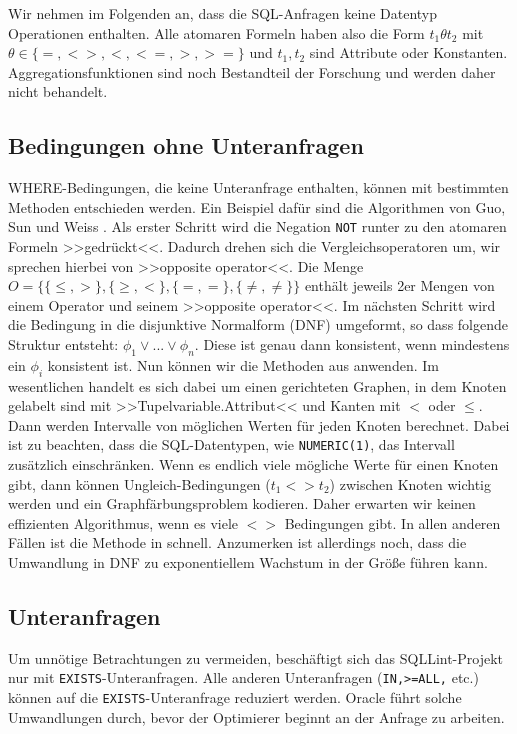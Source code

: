 Wir nehmen im Folgenden an, dass die SQL-Anfragen keine Datentyp Operationen enthalten. Alle atomaren Formeln haben also die Form $t_1\theta t_2$ mit $\theta\in \{=,<>,<,<=,>,>=\}$ und $t_1,t_2$ sind Attribute oder Konstanten. Aggregationsfunktionen sind noch Bestandteil der Forschung und werden daher nicht behandelt.

\subsection{Bedingungen ohne Unteranfragen}

WHERE-Bedingungen, die keine Unteranfrage enthalten, können mit bestimmten Methoden entschieden werden. Ein Beispiel dafür sind die Algorithmen von Guo, Sun und Weiss \cite{decideable1}. Als erster Schritt wird die Negation \verb|NOT| runter zu den atomaren Formeln >>gedrückt<<. Dadurch drehen sich die Vergleichsoperatoren um, wir sprechen hierbei von >>opposite operator<<. Die Menge $O=\{ \{\leq,>\} , \{\geq,<\} , \{ =, =\}, \{\neq,\neq\} \}$ enthält jeweils 2er Mengen von einem Operator und seinem >>opposite operator<<. Im nächsten Schritt wird die Bedingung in die disjunktive Normalform (DNF) umgeformt, so dass folgende Struktur entsteht: $\phi_1 \vee ... \vee \phi_n$. Diese ist genau dann konsistent, wenn mindestens ein $\phi_i$ konsistent ist. Nun können wir die Methoden aus \cite{decideable1} anwenden. Im wesentlichen handelt es sich dabei um einen gerichteten Graphen, in dem Knoten gelabelt sind mit >>Tupelvariable.Attribut<< und Kanten mit $<$ oder $\leq$. Dann werden Intervalle von möglichen Werten für jeden Knoten berechnet. Dabei ist zu beachten, dass die SQL-Datentypen, wie \verb|NUMERIC(1)|, das Intervall zusätzlich einschränken.
Wenn es endlich viele mögliche Werte für einen Knoten gibt, dann können Ungleich-Bedingungen ($t_1<>t_2$) zwischen Knoten wichtig werden und ein Graphfärbungsproblem kodieren. Daher erwarten wir keinen effizienten Algorithmus, wenn es viele $<>$ Bedingungen gibt. In allen anderen Fällen ist die Methode in \cite{decideable1} schnell. Anzumerken ist allerdings noch, dass die Umwandlung in DNF zu exponentiellem Wachstum in der Größe führen kann.

\subsection{Unteranfragen}

Um unnötige Betrachtungen zu vermeiden, beschäftigt sich das SQLLint-Projekt nur mit \verb|EXISTS|-Unteranfragen. Alle anderen Unteranfragen (\verb|IN,>=ALL,| etc.) können auf die \verb|EXISTS|-Unteranfrage reduziert werden. Oracle führt solche Umwandlungen durch, bevor der Optimierer beginnt an der Anfrage zu arbeiten.

